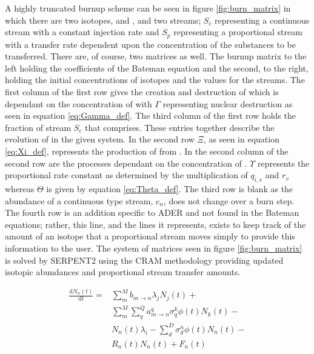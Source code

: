 A highly truncated burnup scheme can be
seen in figure \ref{fig:burn_matrix} in which there are two isotopes,
 and , and two streams; $S_{c}$ representing a
continuous stream with a constant injection rate and $S_{p}$ representing a
proportional stream with a transfer rate dependent upon the concentration
of the substances to be transferred. There are, of course, two matrices as well.
The burnup matrix to the left holding the coefficients of the Bateman equation
and the second, to the right, holding the initial concentrations of isotopes
and the values for the streams. The first column of the first row gives
the creation and destruction of  which is dependant on the
concentration of  with $\Gamma$ representing nuclear destruction as
seen in equation \ref{eq:Gamma_def}. The third column of the first row holds
the fraction of stream $S_{c}$ that  comprises. These entries
together describe the evolution of  in the given system. In the
second row $\Xi$, as seen in equation \ref{eq:Xi_def}, represents the production
of  from . In the second column of the second row are
the processes dependant on the concentration of . $\Upsilon$
represents the proportional rate constant as determined by the multiplication
of $q_{i,v}$ and $r_{v}$ whereas $\Theta$ is given by equation 
\ref{eq:Theta_def}. The third row is blank as the abundance of a continuous type
stream, $c_{n}$, does not change over a burn step. The fourth row is an
addition specific to ADER and not found in the Bateman equations; rather, this
line, and the lines it represents, exists to keep track of the amount of an
isotope that a proportional stream moves simply to provide this information
to the user. The system of matrices seen in figure \ref{fig:burn_matrix} is
solved by SERPENT2 using the CRAM methodology providing updated isotopic
abundances and proportional stream transfer amounts.

    \begin{equation}
    \label{eq:Bateman}
    \begin{split}
        \frac{\mathrm{d}N_{n}(t)}{\mathrm{d}t} = & \sum \limits_{m}^{M} 
        b_{m \rightarrow n} \lambda_{j} N_{j}(t) + \\
        & \sum \limits_{m}^{M}
        \sum \limits_{q}^{Q} a_{m \rightarrow n}^{q}
        \sigma_{q}^{k} \phi(t) N_{k}(t) - \\
        & N_{n}(t) \lambda_{i} - \sum \limits_{d}^{D}
        \sigma_{d}^{n} \phi(t) N_{n}(t) - \\
        & R_{n}(t) N_{n}(t) + F_{n}(t)
    \end{split}
    \end{equation}

